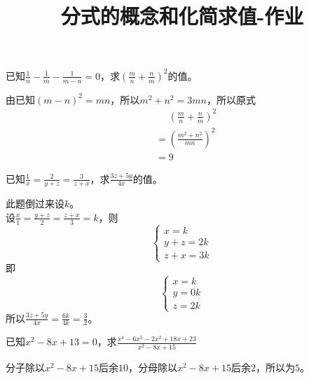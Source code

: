 \documentclass[windows,csize4]{BHCexam}
\title{分式的概念和化简求值-作业}
\begin{document}
\maketitle


\begin{groups}
    \begin{questions}[]

        \question[5] 已知$\frac{1}{n}-\frac{1}{m}-\frac{1}{m-n}=0$，求$\left(\frac{m}{n}+\frac{n}{m}\right)^2$的值。
        \begin{solution}{0.5cm}
            \methodonly 由已知$(m-n)^2=mn$，所以$m^2+n^2=3mn$，所以原式
            \[
                \begin{aligned}
                    &\phantom{=}\left(\frac{m}{n}+\frac{n}{m}\right)^2 \\
                    &= \left(\frac{m^2+n^2}{mn}\right)^2 \\ 
                    &=9
                \end{aligned}
            \]
        \end{solution}
        \vspace{4.5cm}

        \question[5] 已知$\frac{1}{x}=\frac{2}{y+z}=\frac{3}{z+x}$，求$\frac{3z+5y}{4x}$的值。
        \begin{solution}{0.5cm}
            \methodonly 此题倒过来设$k$。\\
            设$\frac{x}{1}=\frac{y+z}{2}=\frac{z+x}{3}=k$，则
            \[
            \begin{cases}
                x=k \\
                y+z=2k \\
                z+x=3k
            \end{cases}
            \]
            即
            \[
            \begin{cases}
                x=k \\
                y=0k \\
                z=2k
            \end{cases}
            \]
            所以$\frac{3z+5y}{4x}=\frac{6k}{4k}=\frac{3}{2}$。
        \end{solution}
        \vspace{4.5cm}

        \question[5] 已知$x^2-8x+13=0$，求$\frac{x^4-6x^3-2x^2+18x+23}{x^2-8x+15}$
        \begin{solution}{0.5cm}
            \methodonly 分子除以$x^2-8x+15$后余$10$，分母除以$x^2-8x+15$后余$2$，所以为$5$。
        \end{solution}
        \vspace{4.5cm}


\end{questions}
\end{groups}
\end{document}
